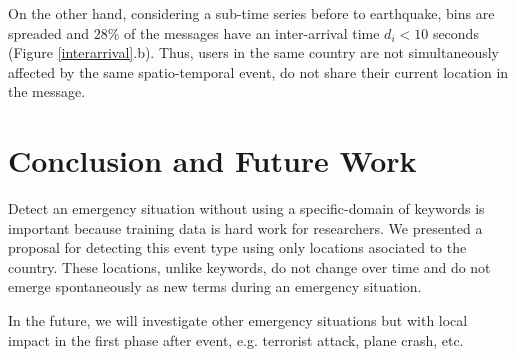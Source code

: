 \documentclass[letterpaper]{article} %
\begin{document}
On the other hand, considering a sub-time series before to earthquake, bins are spreaded and $28\%$ of the messages have an inter-arrival time $d_{i} < 10$ seconds (Figure \ref{interarrival}.b). Thus, users in the same country are not simultaneously affected by the same spatio-temporal event, do not share their current location in the message.

\section{Conclusion and Future Work}
Detect an emergency situation without using a specific-domain of keywords is important because training data is hard work for researchers. We presented a proposal for detecting this event type using only locations asociated to the country. These locations, unlike keywords, do not change over time and do not emerge spontaneously as new terms during an emergency situation.

In the future, we will investigate other emergency situations but with local impact in the first phase after event, e.g. terrorist attack, plane crash, etc.
 


\end{document}
